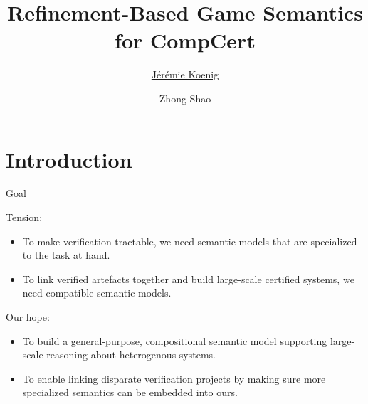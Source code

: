 \documentclass{beamer}
\title{Refinement-Based Game Semantics for CompCert}
\author{\underline{J\'er\'emie Koenig} \and Zhong Shao}
\begin{document}
\maketitle

\section{Introduction}

\begin{frame}{Goal} %

Tension:
\begin{itemize}
\item
  To make verification tractable,
  we need semantic models that are
  specialized to the task at hand.
\item 
  To link verified artefacts together and
  build large-scale certified systems,
  we need compatible semantic models.
\end{itemize}
\vfill

Our hope:
\begin{itemize}
\item
  To build a general-purpose, compositional
  semantic model supporting large-scale reasoning
  about heterogenous systems.
\item
  To enable linking disparate verification projects
  by making sure more specialized semantics
  can be embedded into ours.
\end{itemize}
\vfill

\end{frame}
\end{document}
